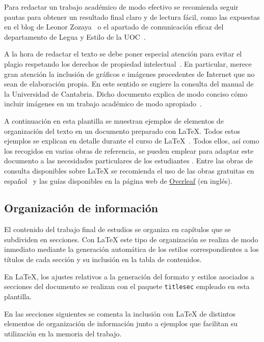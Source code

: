 Para redactar un trabajo académico de modo efectivo se recomienda seguir pautas para obtener un resultado final claro y de lectura fácil, como las expuestas en el blog de Leonor Zozaya~\cite{zozaya17} o el apartado de comunicación eficaz del departamento de Legua y Estilo de la UOC~\cite{uoc}.

A la hora de redactar el texto se debe poner especial atención para evitar el plagio respetando los derechos de propiedad intelectual~\cite{uc3m21}. En particular, merece gran atención la inclusión de gráficos e imágenes procedentes de Internet que no sean de elaboración propia. En este sentido se sugiere la consulta del manual de la Universidad de Cantabria. Dicho documento explica de modo conciso cómo incluir imágenes en un trabajo académico de modo apropiado~\cite{unican18}.

A continuación en esta plantilla se muestran ejemplos de elementos de organización del texto en un documento preparado con \LaTeX{}. Todos estos ejemplos se explican en detalle durante el curso de \LaTeX{}~\cite{salido10}. Todos ellos, así como los recogidos en varias obras de referencia, se pueden emplear para adaptar este documento a las necesidades particulares de los estudiantes \cite{lamport94,grat99,cascales03,mittelbach04,grat07,goos07,wikibookLaTex10}. Entre las obras de consulta disponibles sobre \LaTeX{} se recomienda el uso de las obras gratuitas en español~\cite{oetiker14,borbon21} y las guías disponibles en la página web de \href{https://es.overleaf.com/learn}{Overleaf} (en inglés).




\subsection{Organización de información}
El contenido del trabajo final de estudios se organiza en capítulos que se subdividen en secciones. Con \LaTeX{} este tipo de organización se realiza de modo inmediato mediante la generación automática de los estilos correspondientes a los títulos de cada sección y su inclusión en la tabla de contenidos.

En \LaTeX{}, los ajustes relativos a la generación del formato y estilos asociados a secciones del documento se realizan con el paquete \texttt{titlesec} empleado en esta plantilla.

En las secciones siguientes se comenta la inclusión con \LaTeX{} de distintos elementos de organización de información junto a ejemplos que facilitan su  utilización en la memoria del trabajo.




